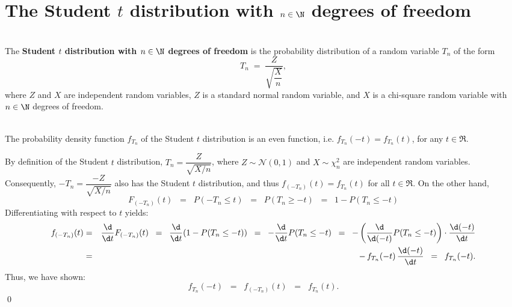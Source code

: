 \documentclass{article}
\begin{document}

\section{The Student $t$ distribution with $n\in\N$ degrees of freedom}
\setcounter{theorem}{0}

\begin{definition}\mbox{}\\
The \textbf{Student $t$ distribution with $n\in\N$ degrees of freedom} is the probability distribution of a random variable $T_{n}$ of the form
\begin{equation*}
T_{n} \; = \; \dfrac{Z}{\sqrt{\dfrac{X}{n}}},
\end{equation*}
where $Z$ and $X$ are independent random variables, $Z$ is a standard normal random variable, and $X$ is a chi-square random variable with $n\in\N$ degrees of freedom.
\end{definition}

\begin{lemma}\mbox{}\\
The probability density function $f_{T_{n}}$ of the Student $t$ distribution is an even function, i.e. $f_{T_{n}}(-t) = f_{T_{n}}(t)$, for any $t \in \Re$.
\end{lemma}

\proof By definition of the Student $t$ distribution, $T_{n} = \dfrac{Z}{\sqrt{X/n}}$, where $Z \sim \mathcal{N}(0,1)$ and $X \sim \chi^{2}_{n}$ are independent random variables.  Consequently, $-T_{n} = \dfrac{-Z}{\sqrt{X/n}}$ also has the Student $t$ distribution, and thus $f_{(-T_{n})}(t) = f_{T_{n}}(t)$ for all $t \in \Re$.  On the other hand,
\begin{equation*}
            F_{(-T_{n})}(t)
\;\;=\;\;  P(-T_{n}\leq t)
\;\;=\;\;  P(T_{n}\geq -t)
\;\;=\;\;  1 - P(T_{n} \leq -t)
\end{equation*}
Differentiating with respect to $t$ yields:
\begin{eqnarray*}
            f_{(-T_{n})}(t)
& = &   \dfrac{\d}{\d t} F_{(-T_{n})}(t)
\;\;=\;\;  \dfrac{\d}{\d t}\!\left(1 - P(T_{n} \leq -t)\right)
\;\;=\;\;  -\dfrac{\d}{\d t} P(T_{n} \leq -t)
\;\;=\;\;  -\left(\dfrac{\d}{\d(-t)} P(T_{n} \leq -t)\right)\cdot\dfrac{\d(-t)}{\d t} \\
& = &   -\, f_{T_{n}}(-t)\,\dfrac{\d(-t)}{\d t}
\;\;=\;\;  f_{T_{n}}(-t).
\end{eqnarray*}
Thus, we have shown:
\begin{equation*}
f_{T_{n}}(-t) \;\; = \;\; f_{(-T_{n})}(t) \;\; = \;\; f_{T_{n}}(t).
\end{equation*}
\qed
\end{document}
